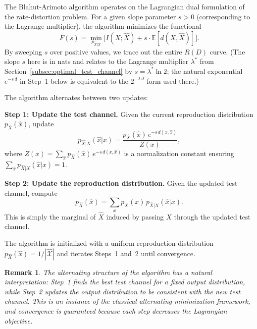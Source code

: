 \documentclass[11pt]{article}
\newtheorem{remark}{Remark}[section]
\newcommand{\RD}{R(D)}
\newcommand{\E}{\mathbb{E}}
\newcommand{\calXhat}{\hat{\mathcal{X}}}
\begin{document}
The Blahut-Arimoto algorithm operates on the Lagrangian dual formulation of
the rate-distortion problem.
For a given slope parameter $s > 0$ (corresponding to the Lagrange multiplier),
the algorithm minimizes the functional
\begin{equation}
\label{eq:ba_functional}
F(s) = \min_{p_{\hat{X}|X}} \bigl[ I(X; \hat{X}) + s \cdot \E[d(X, \hat{X})] \bigr].
\end{equation}
By sweeping $s$ over positive values, we trace out the entire $\RD$ curve.
(The slope $s$ here is in nats and relates to the Lagrange multiplier $\lambda^*$
from Section~\ref{subsec:optimal_test_channel} by $s = \lambda^* \ln 2$; the natural
exponential $e^{-s\,d}$ in Step~1 below is equivalent to the
$2^{-\lambda\,d}$ form used there.)

The algorithm alternates between two updates:

\smallskip
\noindent\textbf{Step 1: Update the test channel.}
Given the current reproduction distribution $p_{\hat{X}}(\hat{x})$, update
\begin{equation}
\label{eq:ba_step1}
p_{\hat{X}|X}(\hat{x}|x) = \frac{p_{\hat{X}}(\hat{x})\, e^{-s\, d(x,\hat{x})}}{Z(x)},
\end{equation}
where $Z(x) = \sum_{\hat{x}} p_{\hat{X}}(\hat{x})\, e^{-s\, d(x,\hat{x})}$ is
a normalization constant ensuring $\sum_{\hat{x}} p_{\hat{X}|X}(\hat{x}|x) = 1$.

\smallskip
\noindent\textbf{Step 2: Update the reproduction distribution.}
Given the updated test channel, compute
\begin{equation}
\label{eq:ba_step2}
p_{\hat{X}}(\hat{x}) = \sum_{x} p_X(x)\, p_{\hat{X}|X}(\hat{x}|x).
\end{equation}
This is simply the marginal of $\hat{X}$ induced by passing $X$ through the
updated test channel.

The algorithm is initialized with a uniform reproduction distribution
$p_{\hat{X}}(\hat{x}) = 1/|\calXhat|$ and iterates Steps~1 and~2 until
convergence.

\begin{remark}
The alternating structure of the algorithm has a natural interpretation:
Step~1 finds the best test channel for a fixed output distribution, while
Step~2 updates the output distribution to be consistent with the new test channel.
This is an instance of the classical alternating minimization framework, and
convergence is guaranteed because each step decreases the Lagrangian objective.
\end{remark}
\end{document}
